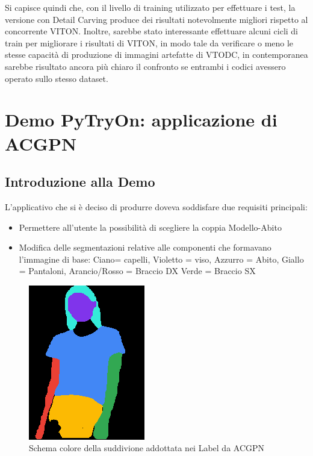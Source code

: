 \documentclass[final, 11pt]{article}
\begin{document}
	
	Si capisce quindi che, con il livello di training utilizzato per effettuare i test, la versione con Detail Carving produce dei risultati notevolmente migliori rispetto al concorrente VITON.
	Inoltre, sarebbe stato interessante effettuare alcuni cicli di train per migliorare i risultati di VITON, in modo tale da verificare o meno le stesse capacità di produzione di immagini artefatte di VTODC, in contemporanea sarebbe risultato ancora più chiaro il confronto se entrambi i codici avessero operato sullo stesso dataset.
	\newpage
	
	\section{Demo PyTryOn: applicazione di ACGPN}
	\subsection{Introduzione alla Demo}
	L’applicativo che si è deciso di produrre doveva soddisfare due requisiti principali:
	\begin{itemize}
		\item Permettere all’utente la possibilità di scegliere la coppia Modello-Abito
		\item Modifica delle segmentazioni relative alle componenti che formavano l’immagine di base:
		Ciano= capelli, Violetto = viso, Azzurro = Abito, Giallo = Pantaloni, Arancio/Rosso = Braccio DX
		Verde = Braccio SX
	\end{itemize}

	\begin{figure}[!htb]
		\begin{center}
			\includegraphics[scale=.7]{002474_0.png}
		\end{center} \caption{Schema colore della suddivione addottata nei Label da ACGPN}
	\end{figure} 
	
\end{document}
